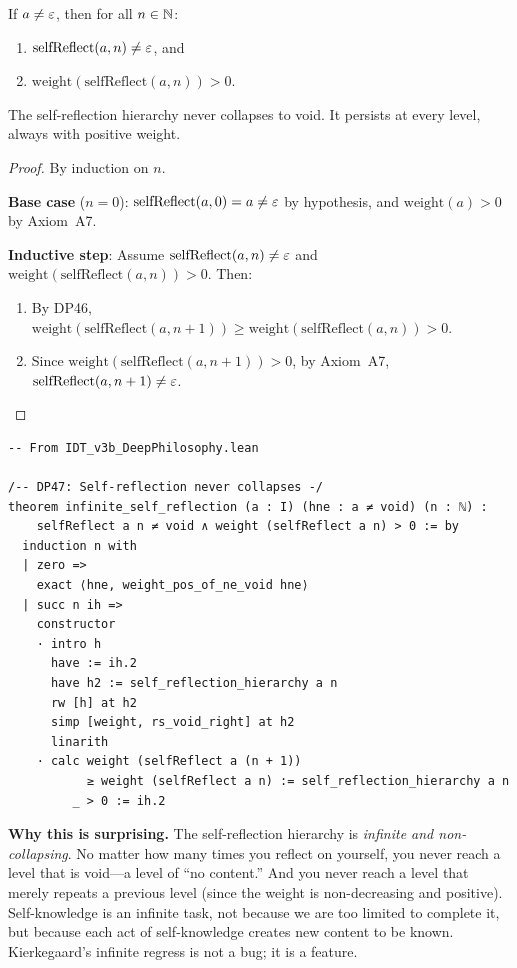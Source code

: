\begin{theorem}
\label{thm:infinite-self-reflection}
If $a \neq \varepsilon$, then for all $n \in \mathbb{N}$:
\begin{enumerate}
\item $\mathrm{selfReflect}(a, n) \neq \varepsilon$, and
\item $\mathrm{weight}(\mathrm{selfReflect}(a, n)) > 0$.
\end{enumerate}
The self-reflection hierarchy never collapses to void.  It persists at every
level, always with positive weight.
\end{theorem}

\begin{proof}
By induction on $n$.

\textbf{Base case} ($n = 0$): $\mathrm{selfReflect}(a, 0) = a \neq \varepsilon$
by hypothesis, and $\mathrm{weight}(a) > 0$ by Axiom~A7.

\textbf{Inductive step}: Assume $\mathrm{selfReflect}(a, n) \neq \varepsilon$ and
$\mathrm{weight}(\mathrm{selfReflect}(a, n)) > 0$.  Then:
\begin{enumerate}
\item By DP46, $\mathrm{weight}(\mathrm{selfReflect}(a, n+1)) \geq
  \mathrm{weight}(\mathrm{selfReflect}(a, n)) > 0$.
\item Since $\mathrm{weight}(\mathrm{selfReflect}(a, n+1)) > 0$, by
  Axiom~A7, $\mathrm{selfReflect}(a, n+1) \neq \varepsilon$.
\end{enumerate}
\end{proof}

\begin{lstlisting}
-- From IDT_v3b_DeepPhilosophy.lean

/-- DP47: Self-reflection never collapses -/
theorem infinite_self_reflection (a : I) (hne : a ≠ void) (n : ℕ) :
    selfReflect a n ≠ void ∧ weight (selfReflect a n) > 0 := by
  induction n with
  | zero =>
    exact ⟨hne, weight_pos_of_ne_void hne⟩
  | succ n ih =>
    constructor
    · intro h
      have := ih.2
      have h2 := self_reflection_hierarchy a n
      rw [h] at h2
      simp [weight, rs_void_right] at h2
      linarith
    · calc weight (selfReflect a (n + 1))
           ≥ weight (selfReflect a n) := self_reflection_hierarchy a n
         _ > 0 := ih.2
\end{lstlisting}

\begin{surprisebox}
\noindent\textbf{Why this is surprising.}
The self-reflection hierarchy is \emph{infinite and non-collapsing}.  No
matter how many times you reflect on yourself, you never reach a level that
is void---a level of ``no content.''  And you never reach a level that
merely repeats a previous level (since the weight is non-decreasing and
positive).  Self-knowledge is an infinite task, not because we are too
limited to complete it, but because each act of self-knowledge creates
new content to be known.  Kierkegaard's infinite regress is not a bug;
it is a feature.
\end{surprisebox}

